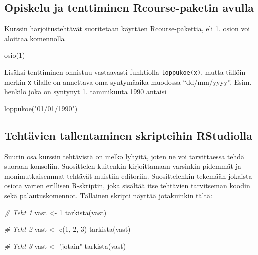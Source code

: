 \documentclass[
]{book}
\newenvironment{Shaded}{\begin{snugshade}}{\end{snugshade}}
\newcommand{\CommentTok}[1]{\textcolor[rgb]{0.56,0.35,0.01}{\textit{#1}}}
\newcommand{\DecValTok}[1]{\textcolor[rgb]{0.00,0.00,0.81}{#1}}
\newcommand{\FunctionTok}[1]{\textcolor[rgb]{0.00,0.00,0.00}{#1}}
\newcommand{\NormalTok}[1]{#1}
\newcommand{\OtherTok}[1]{\textcolor[rgb]{0.56,0.35,0.01}{#1}}
\newcommand{\StringTok}[1]{\textcolor[rgb]{0.31,0.60,0.02}{#1}}
\begin{document}
\hypertarget{opiskelu-ja-tenttiminen-rcourse-paketin-avulla}{%
\subsection*{Opiskelu ja tenttiminen Rcourse-paketin avulla}\label{opiskelu-ja-tenttiminen-rcourse-paketin-avulla}}

Kurssin harjoitustehtävät suoritetaan käyttäen Rcourse-pakettia, eli 1. osion voi aloittaa komennolla

\begin{Shaded}
\begin{Highlighting}[]
\FunctionTok{osio}\NormalTok{(}\DecValTok{1}\NormalTok{)}
\end{Highlighting}
\end{Shaded}

Lisäksi tenttiminen onnistuu vastaavasti funktiolla \texttt{loppukoe(x)}, mutta tällöin merkin \texttt{x} tilalle on annettava oma syntymäaika muodossa ``dd/mm/yyyy''. Esim. henkilö joka on syntynyt 1. tammikuuta 1990 antaisi

\begin{Shaded}
\begin{Highlighting}[]
\FunctionTok{loppukoe}\NormalTok{(}\StringTok{"01/01/1990"}\NormalTok{)}
\end{Highlighting}
\end{Shaded}

\hypertarget{tehtuxe4vien-tallentaminen-skripteihin-rstudiolla}{%
\subsection*{Tehtävien tallentaminen skripteihin RStudiolla}\label{tehtuxe4vien-tallentaminen-skripteihin-rstudiolla}}

Suurin osa kurssin tehtävistä on melko lyhyitä, joten ne voi tarvittaessa tehdä suoraan konsoliin. Suosittelen kuitenkin kirjoittamaan varsinkin pidemmät ja monimutkaisemmat tehtävät muistiin editoriin. Suosittelenkin tekemään jokaista osiota varten erillisen R-skriptin, joka sisältää itse tehtävien tarvitseman koodin sekä palautuskomennot. Tällainen skripti näyttää jotakuinkin tältä:

\begin{Shaded}
\begin{Highlighting}[]
\CommentTok{\# Teht 1}
\NormalTok{vast }\OtherTok{\textless{}{-}} \DecValTok{1}
\FunctionTok{tarkista}\NormalTok{(vast)}

\CommentTok{\# Teht 2}
\NormalTok{vast }\OtherTok{\textless{}{-}} \FunctionTok{c}\NormalTok{(}\DecValTok{1}\NormalTok{, }\DecValTok{2}\NormalTok{, }\DecValTok{3}\NormalTok{)}
\FunctionTok{tarkista}\NormalTok{(vast)}

\CommentTok{\# Teht 3}
\NormalTok{vast }\OtherTok{\textless{}{-}} \StringTok{"jotain"}
\FunctionTok{tarkista}\NormalTok{(vast)}
\end{Highlighting}
\end{Shaded}
\end{document}
